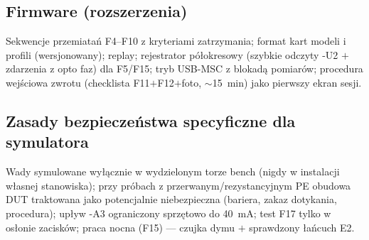 \documentclass[11pt,a4paper]{article}
\begin{document}
\subsection{Firmware (rozszerzenia)}
Sekwencje przemiatań F4--F10 z kryteriami zatrzymania; format kart modeli i profili (wersjonowany);
replay; rejestrator półokresowy (szybkie odczyty -U2 $+$ zdarzenia z opto faz) dla F5/F15;
tryb USB-MSC z blokadą pomiarów; procedura wejściowa zwrotu (checklista F11$+$F12$+$foto,
$\sim$15~min) jako pierwszy ekran sesji.
\subsection{Zasady bezpieczeństwa specyficzne dla symulatora}
Wady symulowane wyłącznie w wydzielonym torze bench (nigdy w instalacji własnej stanowiska);
przy próbach z przerwanym/rezystancyjnym PE obudowa DUT traktowana jako potencjalnie niebezpieczna
(bariera, zakaz dotykania, procedura); upływ -A3 ograniczony sprzętowo do 40~mA; test F17 tylko
w osłonie zacisków; praca nocna (F15) --- czujka dymu $+$ sprawdzony łańcuch E2.
\end{document}
